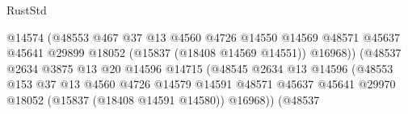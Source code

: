 \begin{lexlean}{RustStd}
\begin{coremodule}
                                                    @14574
                                                    (@48553
                                                      @467
                                                      @37
                                                      @13
                                                      @4560
                                                      @4726
                                                      @14550
                                                      @14569
                                                      @48571
                                                      @45637
                                                      @45641
                                                      @29899
                                                      @18052
                                                      (@15837 (@18408 @14569 @14551))
                                                      @16968))
                                                  (@48537
                                                    @2634
                                                    @3875
                                                    @13
                                                    @20
                                                    @14596
                                                    @14715
                                                    (@48545
                                                      @2634
                                                      @13
                                                      @14596
                                                      (@48553
                                                        @153
                                                        @37
                                                        @13
                                                        @4560
                                                        @4726
                                                        @14579
                                                        @14591
                                                        @48571
                                                        @45637
                                                        @45641
                                                        @29970
                                                        @18052
                                                        (@15837 (@18408 @14591 @14580))
                                                        @16968))
                                                    (@48537

\end{coremodule}
\end{lexlean}
